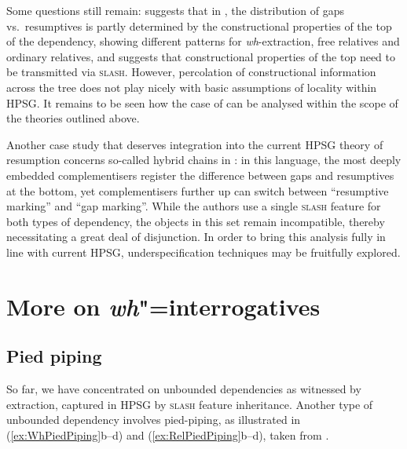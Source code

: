 \documentclass[output=paper
,notxmath 
 	        ,biblatex
                ,babelshorthands
                ,newtxmath
                ,draftmode
                ,colorlinks, citecolor=brown
]{langscibook}
\begin{document}
Some questions still remain: \citet[Section~6.5]{taghvaipour:phd:05}
suggests that in , the distribution of gaps vs.\ resumptives is
partly determined by the constructional properties of the top of the
dependency, showing different patterns for \emph{wh}-extraction, free
relatives and ordinary relatives, and suggests that constructional
properties of the top need to be transmitted via \textsc{slash}.
However, percolation of constructional information across the tree
does not play nicely with basic assumptions of locality within
HPSG. It remains to be seen how the case of  can be analysed
within the scope of the theories outlined above.

Another case study that deserves integration into the current HPSG
theory of resumption concerns so-called hybrid chains in 
\citep{assmann10:_does_chain_hybrid_irish_suppor}: in this language,
the most deeply embedded complementisers register the difference
between gaps and resumptives at the bottom, yet complementisers
further up can switch between ``resumptive marking'' and ``gap
marking''. While the authors use a single \textsc{slash} feature for
both types of dependency, the objects in this set remain incompatible,
thereby necessitating a great deal of disjunction. In order to bring
this analysis fully in line with current HPSG, underspecification
techniques may be fruitfully explored.



\section{More on \emph{wh}"=interrogatives}
\label{sec:UDC:MoreWh}

\subsection{Pied piping}

So far, we have concentrated on unbounded dependencies as witnessed by
extraction, captured in HPSG by \textsc{slash} feature
inheritance. Another type of unbounded dependency involves
pied-piping, as illustrated in (\ref{ex:WhPiedPiping}b--d) and
(\ref{ex:RelPiedPiping}b--d), taken from \citet[184]{Ginzburg:Sag:01}.
\end{document}
